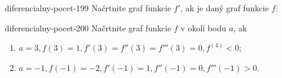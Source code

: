 \begin{defproblem}{diferencialny-pocet-199}
Načrtnite graf funkcie $f'$, ak je daný graf funkcie $f$:

\end{defproblem}

\begin{defproblem}{diferencialny-pocet-200}
Načrtnite graf funkcie $f$ v okolí bodu $a$, ak
\begin{enumerate}
\item $a=3,f(3)=1,f'(3)=f''(3)=f'''(3)=0,f^{(4)}<0$;
\item $a=-1,f(-1)=-2,f'(-1)=1,f''(-1)=0,f'''(-1)>0$.
\end{enumerate}
\end{defproblem}